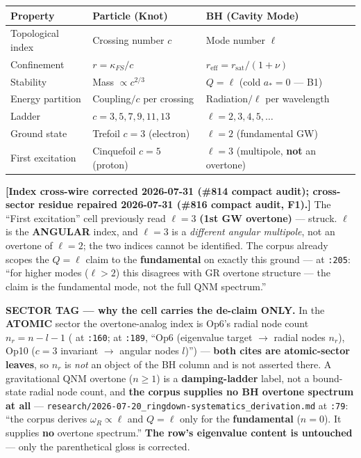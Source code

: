 \begin{center}
\renewcommand{\arraystretch}{1.3}
\begin{tabular}{l l l}
\toprule
\textbf{Property} & \textbf{Particle (Knot)} & \textbf{BH (Cavity Mode)} \\
\midrule
Topological index & Crossing number $c$ & Mode number $\ell$ \\
Confinement & $r = \kappa_{FS} / c$ & $r_\mathrm{eff} = r_\mathrm{sat}/(1+\nu)$ \\
Stability & Mass $\propto c^{2/3}$ & $Q = \ell$ (cold $a_*=0$ --- B1) \\
Energy partition & Coupling$/c$ per crossing & Radiation$/\ell$ per wavelength \\
Ladder & $c = 3, 5, 7, 9, 11, 13$ & $\ell = 2, 3, 4, 5, \ldots$ \\
Ground state & Trefoil $c = 3$ (electron) & $\ell = 2$ (fundamental GW) \\
First excitation & Cinquefoil $c = 5$ (proton) & $\ell = 3$ (multipole, \textbf{not} an overtone) \\
\bottomrule
\end{tabular}
\end{center}

\noindent\textbf{[Index cross-wire corrected 2026-07-31 (\#814 compact audit); cross-sector
residue repaired 2026-07-31 (\#816 compact audit, F1).]} The ``First excitation'' cell
previously read $\ell = 3$ \textbf{(1st GW overtone)} --- struck.  $\ell$ is the
\textbf{ANGULAR} index, and $\ell = 3$ is a \emph{different angular multipole}, not an
overtone of $\ell = 2$; the two indices cannot be identified.  The corpus already scopes the
$Q = \ell$ claim to the \textbf{fundamental} on exactly this ground ---
 at \texttt{:205}: ``for higher modes
($\ell > 2$) this disagrees with GR overtone structure --- the claim is the fundamental
mode, not the full QNM spectrum.''

\noindent\textbf{SECTOR TAG --- why the cell carries the de-claim ONLY.}  In the
\textbf{ATOMIC} sector the overtone-analog index is Op6's radial node count
$n_r = n - l - 1$
(
at \texttt{:160};  at \texttt{:189},
``Op6 (eigenvalue target $\to$ radial nodes $n_r$), Op10 ($c=3$ invariant $\to$ angular
nodes $l$)'') --- \textbf{both cites are atomic-sector leaves}, so $n_r$ is \emph{not} an
object of the BH column and is not asserted there.  A gravitational QNM overtone
($n \ge 1$) is a \textbf{damping-ladder} label, not a bound-state radial node count, and
\textbf{the corpus supplies no BH overtone spectrum at all} ---
\texttt{research/2026-07-20\_ringdown-systematics\_derivation.md} at \texttt{:79}:
``the corpus derives $\omega_R \propto \ell$ and $Q = \ell$ only for the
\textbf{fundamental} ($n=0$).  It supplies \textbf{no} overtone spectrum.''
\textbf{The row's eigenvalue content is untouched} --- only the parenthetical gloss is
corrected.

